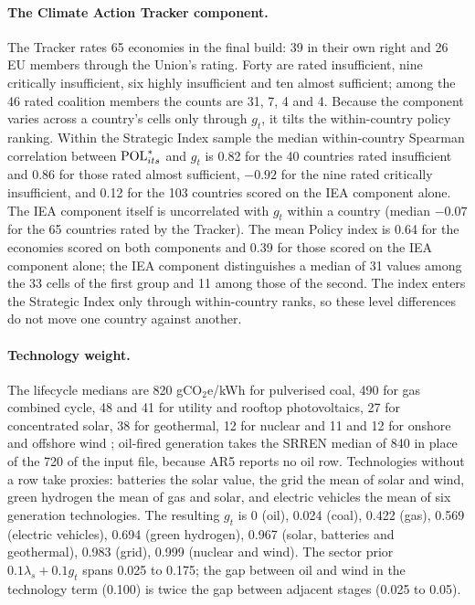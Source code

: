 \paragraph{The Climate Action Tracker component.} The Tracker rates 65 economies in the final build:
39 in their own right and 26 EU members through the Union's rating. Forty are rated insufficient,
nine critically insufficient, six highly insufficient and ten almost sufficient; among the 46 rated
coalition members the counts are 31, 7, 4 and 4. Because the component varies across a country's
cells only through $g_t$, it tilts the within-country policy ranking. Within the Strategic Index
sample the median within-country Spearman correlation between $\mathrm{POL}^{*}_{its}$ and $g_t$ is 0.82
for the 40 countries rated insufficient and 0.86 for those rated almost sufficient, $-0.92$ for the
nine rated critically insufficient, and 0.12 for the 103 countries scored on the IEA component alone.
The IEA component itself is uncorrelated with $g_t$ within a country (median $-0.07$ for the 65
countries rated by the Tracker). The mean Policy index is 0.64 for the economies scored on both
components and 0.39 for those scored on the IEA component alone; the IEA component distinguishes
a median of 31 values among the 33 cells of the first group and 11 among those of the second. The
index enters the Strategic Index only through within-country ranks, so these level differences do
not move one country against another.

\paragraph{Technology weight.} The lifecycle medians are 820 gCO$_2$e/kWh for pulverised coal, 490
for gas combined cycle, 48 and 41 for utility and rooftop photovoltaics, 27 for concentrated solar,
38 for geothermal, 12 for nuclear and 11 and 12 for onshore and offshore wind
\citep{schlomer2014annex}; oil-fired generation takes the SRREN median of 840 \citep{moomaw2011annex}
in place of the 720 of the input file, because AR5 reports no oil row. Technologies without a row
take proxies: batteries the solar value, the grid the mean of solar and wind, green hydrogen the mean
of gas and solar, and electric vehicles the mean of six generation technologies. The resulting
$g_t$ is 0 (oil), 0.024 (coal), 0.422 (gas), 0.569 (electric vehicles), 0.694 (green hydrogen),
0.967 (solar, batteries and geothermal), 0.983 (grid), 0.999 (nuclear and wind). The sector prior
$0.1\lambda_s+0.1g_t$ spans 0.025 to 0.175; the gap between oil and wind in the technology term
(0.100) is twice the gap between adjacent stages (0.025 to 0.05).

